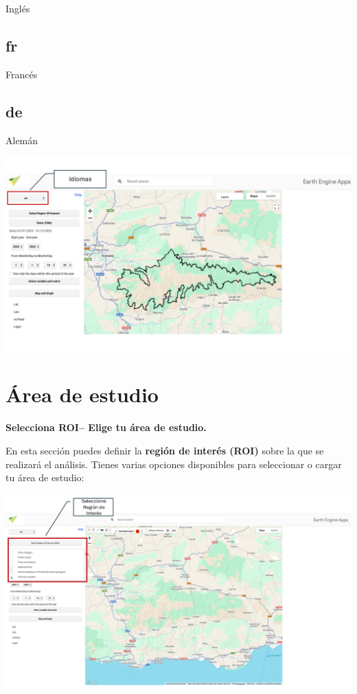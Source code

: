 \documentclass[
]{book}
\begin{document}
Inglés

\section{fr}\label{fr}

Francés

\section{de}\label{de}

Alemán

\includegraphics{assets/Idiomas.png}

\chapter{Área de estudio}\label{area-estudio}

\textbf{Selecciona ROI-- Elige tu área de estudio.}

En esta sección puedes definir la \textbf{región de interés (ROI)} sobre la que se realizará el análisis. Tienes varias opciones disponibles para seleccionar o cargar tu área de estudio:

\includegraphics{assets/ROI_es.png}
\end{document}
